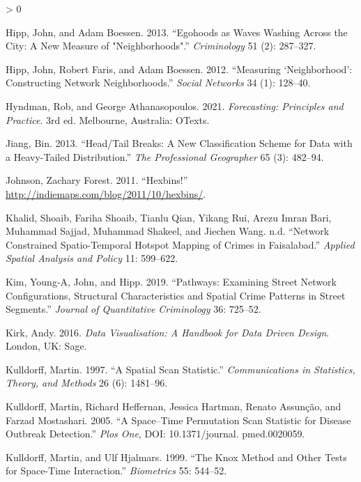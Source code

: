 \documentclass[
  krantz2]{krantz}
\newlength{\cslhangindent}
\newenvironment{CSLReferences}[2] %
 {%
  \setlength{\parindent}{0pt}
  \ifodd #1 \everypar{\setlength{\hangindent}{\cslhangindent}}\ignorespaces\fi
  \ifnum #2 > 0
  \setlength{\parskip}{#2\baselineskip}
  \fi
 }%
 {}
\begin{document}
\begin{CSLReferences}{1}{0}
\leavevmode\hypertarget{ref-Hipp_2013}{}%
Hipp, John, and Adam Boessen. 2013. {``Egohoods as Waves Washing Across the City: A New Measure of "Neighborhoods".''} \emph{Criminology} 51 (2): 287--327.

\leavevmode\hypertarget{ref-Hipp_2012}{}%
Hipp, John, Robert Faris, and Adam Boessen. 2012. {``Measuring {`Neighborhood'}: Constructing Network Neighborhoods.''} \emph{Social Networks} 34 (1): 128--40.

\leavevmode\hypertarget{ref-Hyndman_2021}{}%
Hyndman, Rob, and George Athanasopoulos. 2021. \emph{Forecasting: Principles and Practice}. 3rd ed. Melbourne, Australia: OTexts.

\leavevmode\hypertarget{ref-Jiang_2013}{}%
Jiang, Bin. 2013. {``Head/Tail Breaks: A New Classification Scheme for Data with a Heavy-Tailed Distribution.''} \emph{The Professional Geographer} 65 (3): 482--94.

\leavevmode\hypertarget{ref-Johnson_2011}{}%
Johnson, Zachary Forest. 2011. {``Hexbins!''} \url{http://indiemaps.com/blog/2011/10/hexbins/}.

\leavevmode\hypertarget{ref-Khalid_2018}{}%
Khalid, Shoaib, Fariha Shoaib, Tianlu Qian, Yikang Rui, Arezu Imran Bari, Muhammad Sajjad, Muhammad Shakeel, and Jiechen Wang. n.d. {``Network Constrained Spatio-Temporal Hotspot Mapping of Crimes in Faisalabad.''} \emph{Applied Spatial Analysis and Policy} 11: 599--622.

\leavevmode\hypertarget{ref-Kim_2019}{}%
Kim, Young‑A, John, and Hipp. 2019. {``Pathways: Examining Street Network Configurations, Structural Characteristics and Spatial Crime Patterns in Street Segments.''} \emph{Journal of Quantitative Criminology} 36: 725--52.

\leavevmode\hypertarget{ref-Kirk_2016}{}%
Kirk, Andy. 2016. \emph{Data Visualisation: A Handbook for Data Driven Design}. London, UK: Sage.

\leavevmode\hypertarget{ref-Kulldorff_1997}{}%
Kulldorff, Martin. 1997. {``A Spatial Scan Statistic.''} \emph{Communications in Statistics, Theory, and Methods} 26 (6): 1481--96.

\leavevmode\hypertarget{ref-Kulldorff_2005}{}%
Kulldorff, Martin, Richard Heffernan, Jessica Hartman, Renato Assunção, and Farzad Mostashari. 2005. {``A Space--Time Permutation Scan Statistic for Disease Outbreak Detection.''} \emph{Plos One}, DOI: 10.1371/journal. pmed.0020059.

\leavevmode\hypertarget{ref-Kulldorff_1999}{}%
Kulldorff, Martin, and Ulf Hjalmars. 1999. {``The Knox Method and Other Tests for Space-Time Interaction.''} \emph{Biometrics} 55: 544--52.


\end{CSLReferences}
\end{document}
